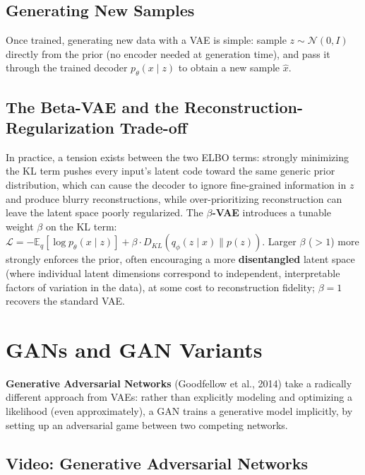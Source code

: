\documentclass[12pt,a4paper]{article}
\begin{document}
\subsection{Generating New Samples}

Once trained, generating new data with a VAE is simple: sample $z \sim \mathcal{N}(0, I)$ directly from the prior (no encoder needed at generation time), and pass it through the trained decoder $p_\theta(x\mid z)$ to obtain a new sample $\hat x$.

\subsection{The Beta-VAE and the Reconstruction-Regularization Trade-off}

\begin{keyidea}
In practice, a tension exists between the two ELBO terms: strongly minimizing the KL term pushes every input's latent code toward the same generic prior distribution, which can cause the decoder to ignore fine-grained information in $z$ and produce blurry reconstructions, while over-prioritizing reconstruction can leave the latent space poorly regularized. The \textbf{$\beta$-VAE} introduces a tunable weight $\beta$ on the KL term: $\mathcal{L} = -\mathbb{E}_q[\log p_\theta(x\mid z)] + \beta \cdot D_{KL}(q_\phi(z\mid x)\|p(z))$. Larger $\beta$ ($>1$) more strongly enforces the prior, often encouraging a more \textbf{disentangled} latent space (where individual latent dimensions correspond to independent, interpretable factors of variation in the data), at some cost to reconstruction fidelity; $\beta=1$ recovers the standard VAE.
\end{keyidea}

\newpage

\section{GANs and GAN Variants}

\textbf{Generative Adversarial Networks} (Goodfellow et al., 2014) take a radically different approach from VAEs: rather than explicitly modeling and optimizing a likelihood (even approximately), a GAN trains a generative model implicitly, by setting up an adversarial game between two competing networks.

\subsection{Video: Generative Adversarial Networks}
\end{document}
